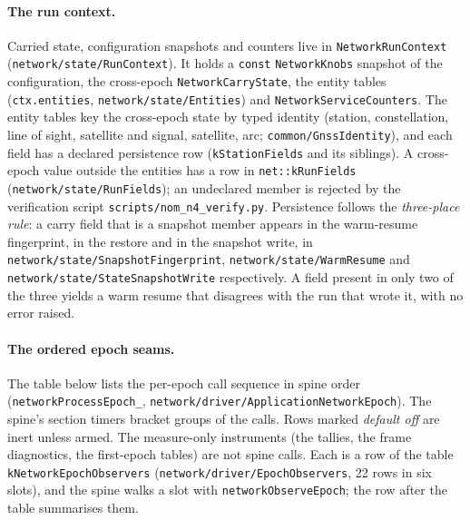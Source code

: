 \documentclass[main.tex]{subfiles}
\begin{document}
\paragraph{The run context.}
Carried state, configuration snapshots and counters live in
\texttt{NetworkRunContext} (\texttt{network/state/RunContext}). It holds a
\texttt{const} \texttt{NetworkKnobs} snapshot of the configuration, the
cross-epoch \texttt{NetworkCarryState}, the entity tables
(\texttt{ctx.entities}, \texttt{network/state/Entities}) and
\texttt{NetworkServiceCounters}. The entity tables key the cross-epoch
state by typed identity (station, constellation, line of sight,
satellite and signal, satellite, arc; \texttt{common/GnssIdentity}), and
each field has a declared persistence row (\texttt{kStationFields} and
its siblings). A cross-epoch value outside the entities has a row in
\texttt{net::kRunFields} (\texttt{network/state/RunFields}); an
undeclared member is rejected by the verification script
\texttt{scripts/nom\_n4\_verify.py}. Persistence follows the
\emph{three-place rule}: a carry field that is a snapshot member appears
in the warm-resume fingerprint, in the restore and in the snapshot
write, in \texttt{network/state/SnapshotFingerprint},
\texttt{network/state/WarmResume} and
\texttt{network/state/StateSnapshotWrite} respectively. A field present
in only two of the three yields a warm resume that disagrees with the
run that wrote it, with no error raised.

\paragraph{The ordered epoch seams.}
The table below lists the per-epoch call sequence in spine order
(\texttt{networkProcessEpoch\_},
\texttt{network/driver/ApplicationNetworkEpoch}). The spine's section
timers bracket groups of the calls. Rows marked \emph{default off} are
inert unless armed. The measure-only instruments (the tallies, the
frame diagnostics, the first-epoch tables) are not spine calls. Each is a
row of the table \texttt{kNetworkEpochObservers}
(\texttt{network/driver/EpochObservers}, 22 rows in six slots), and the
spine walks a slot with \texttt{networkObserveEpoch}; the row after the
table summarises them.
\end{document}
